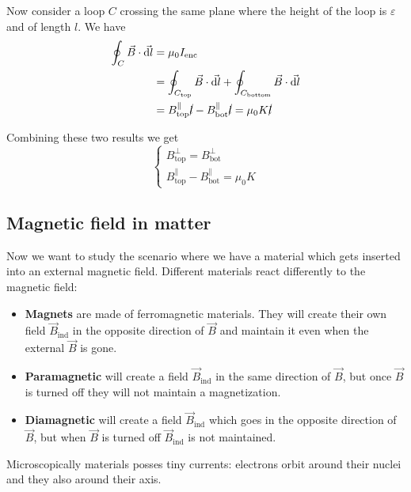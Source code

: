 \documentclass[12pt]{extarticle}
\begin{document}
Now consider a loop $C$ crossing the same plane where the height of the loop is $\varepsilon$ and of length $l$.
We have
\begin{align}
    \oint_C \vec B \cdot \vec{\dd l} & = \mu_0 I_\text{enc}                                                                             \\
                                     & = \oint_{C_\text{top}}\vec B \cdot \vec{\dd l} + \oint_{C_\text{bottom}}\vec B \cdot \vec{\dd l} \\
                                     & = B^{\parallel}_\text{top} \cancel l - B^{\parallel}_\text{bot} \cancel l = \mu_0 K \cancel l
\end{align}

Combining these two results we get
\begin{equation}
    \begin{cases}
        B_\text{top}^{\perp} = B_\text{bot}^{\perp} \\
        B^{\parallel}_\text{top} - B^{\parallel}_\text{bot} = \mu_0 K
    \end{cases}
\end{equation}

\subsection{Magnetic field in matter}
Now we want to study the scenario where we have a material which gets inserted into an external magnetic field.
Different materials react differently to the magnetic field:
\begin{itemize}
    \item \textbf{Magnets} are made of ferromagnetic materials.
          They will create their own field $\vec B_\text{ind}$
          in the opposite direction of $\vec B$ and maintain it even when the external $\vec B$ is gone.
    \item \textbf{Paramagnetic} will create a field
          $\vec B_\text{ind}$ in the same direction of $\vec B$,
          but once $\vec B$ is turned off they will not maintain a magnetization.
    \item \textbf{Diamagnetic} will create a field $\vec B_\text{ind}$
          which goes in the opposite direction of $\vec B$,
          but when $\vec B$ is turned off $\vec B_\text{ind}$ is not maintained.
\end{itemize}

Microscopically materials posses tiny currents:
electrons orbit around their nuclei and they also  around their axis.
\end{document}
